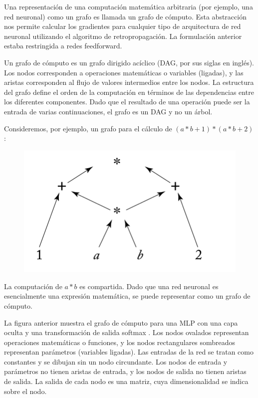 Una representación de una computación matemática arbitraria (por ejemplo, una red neuronal) como un grafo es llamada un grafo de cómputo. Esta abstracción nos permite calcular los gradientes para cualquier tipo de arquitectura de red neuronal utilizando el algoritmo de retropropagación. La formulación anterior estaba restringida a redes feedforward.

Un grafo de cómputo es un grafo dirigido acíclico (DAG, por sus siglas en inglés). Los nodos corresponden a operaciones matemáticas o variables (ligadas), y las aristas corresponden al flujo de valores intermedios entre los nodos. La estructura del grafo define el orden de la computación en términos de las dependencias entre los diferentes componentes. Dado que el resultado de una operación puede ser la entrada de varias continuaciones, el grafo es un DAG y no un árbol.

Consideremos, por ejemplo, un grafo para el cálculo de $(a*b+1)*(a*b+2)$:

\begin{figure}[htb]
	\centering
	 \includegraphics[scale=0.25]{pics/compGraph.png}
\end{figure}

La computación de $a*b$ es compartida. Dado que una red neuronal es esencialmente una expresión matemática, se puede representar como un grafo de cómputo.

La figura anterior muestra el grafo de cómputo para una MLP con una capa oculta y una transformación de salida softmax \cite{goldberg2017neural}. Los nodos ovalados representan operaciones matemáticas o funciones, y los nodos rectangulares sombreados representan parámetros (variables ligadas). Las entradas de la red se tratan como constantes y se dibujan sin un nodo circundante. Los nodos de entrada y parámetros no tienen aristas de entrada, y los nodos de salida no tienen aristas de salida. La salida de cada nodo es una matriz, cuya dimensionalidad se indica sobre el nodo.

